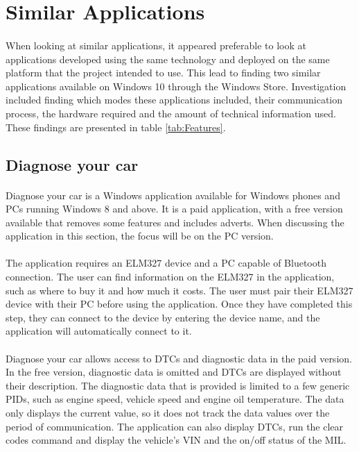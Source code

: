 \section{Similar Applications}
	\paragraph{}{
	When looking at similar applications, it appeared preferable to look at applications developed using the same technology and deployed on the same platform that the project intended to use. This lead to finding two similar applications available on Windows 10 through the Windows Store. Investigation included finding which modes these applications included, their communication process, the hardware required and the amount of technical information used. These findings are presented in table \ref{tab:Features}.
	}
	
	
	
	\subsection{Diagnose your car}
		\paragraph{}{
		Diagnose your car is a Windows application available for Windows phones and PCs running Windows 8 and above. It is a paid application, with a free version available that removes some features and includes adverts. When discussing the application in this section, the focus will be on the PC version.
		}
		\paragraph{}{
		The application requires an ELM327 device and a PC capable of Bluetooth connection. The user can find information on the ELM327 in the application, such as where to buy it and how much it costs. The user must pair their ELM327 device with their PC before using the application. Once they have completed this step, they can connect to the device by entering the device name, and the application will automatically connect to it.
		}
		\paragraph{}{
		Diagnose your car allows access to DTCs and diagnostic data in the paid version. In the free version, diagnostic data is omitted and DTCs are displayed without their description. The diagnostic data that is provided is limited to a few generic PIDs, such as engine speed, vehicle speed and engine oil temperature. The data only displays the current value, so it does not track the data values over the period of communication. The application can also display DTCs, run the clear codes command and display the vehicle's VIN and the on/off status of the MIL.		
		}
